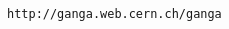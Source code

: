 \documentclass[a4paper]{jpconf}
\begin{document}
\begin{thebibliography}{30}









\verb"http://ganga.web.cern.ch/ganga"









\end{thebibliography}
\end{document}
